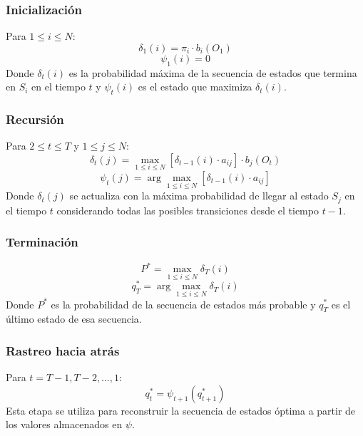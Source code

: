\subsubsection{Inicialización}
Para $1 \leq i \leq N$:
\begin{equation}
	\delta_1(i) = \pi_i \cdot b_i(O_1)
\end{equation}
\begin{equation}
	\psi_1(i) = 0
\end{equation}
Donde $\delta_t(i)$ es la probabilidad máxima de la secuencia de estados que termina en $S_i$ en el tiempo $t$ y $\psi_t(i)$ es el estado que maximiza $\delta_t(i)$.

\subsubsection{Recursión}
Para $2 \leq t \leq T$ y $1 \leq j \leq N$:
\begin{equation}
	\delta_t(j) = \max_{1 \leq i \leq N} [\delta_{t-1}(i) \cdot a_{ij}] \cdot b_j(O_t)
\end{equation}
\begin{equation}
	\psi_t(j) = \arg\max_{1 \leq i \leq N} [\delta_{t-1}(i) \cdot a_{ij}]
\end{equation}
Donde $\delta_t(j)$ se actualiza con la máxima probabilidad de llegar al estado $S_j$ en el tiempo $t$ considerando todas las posibles transiciones desde el tiempo $t-1$.

\subsubsection{Terminación}
\begin{equation}
	P^* = \max_{1 \leq i \leq N} \delta_T(i)
\end{equation}
\begin{equation}
	q_T^* = \arg\max_{1 \leq i \leq N} \delta_T(i)
\end{equation}
Donde $P^*$ es la probabilidad de la secuencia de estados más probable y $q_T^*$ es el último estado de esa secuencia.

\subsubsection{Rastreo hacia atrás}
Para $t = T-1, T-2, \ldots, 1$:
\begin{equation}
	q_t^* = \psi_{t+1}(q_{t+1}^*)
\end{equation}
Esta etapa se utiliza para reconstruir la secuencia de estados óptima a partir de los valores almacenados en $\psi$.

